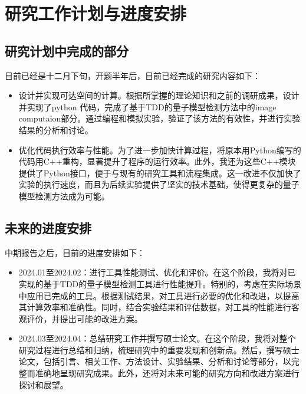 \section{研究工作计划与进度安排}
\subsection{研究计划中完成的部分}
目前已经是十二月下旬，开题半年后，目前已经完成的研究内容如下：
\begin{itemize}
    \item 设计并实现可达空间的计算。根据所掌握的理论知识和之前的调研成果，设计并实现了python 代码，完成了基于TDD的量子模型检测方法中的image computaion部分。通过编程和模拟实验，验证了该方法的有效性，并进行实验结果的分析和讨论。
    \item 优化代码执行效率与性能。为了进一步加快计算过程，将原本用Python编写的代码用C++重构，显著提升了程序的运行效率。此外，我还为这些C++模块提供了Python接口，便于与现有的研究工具和流程集成。这一改进不仅加快了实验的执行速度，而且为后续实验提供了坚实的技术基础，使得更复杂的量子模型检测方法成为可能。
\end{itemize}
\subsection{未来的进度安排}
中期报告之后，目前的进度安排如下： 
\begin{itemize}
    \item 2024.01至2024.02：进行工具性能测试、优化和评价。在这个阶段，我将对已实现的基于TDD的量子模型检测工具进行性能提升。特别的，考虑在实际场景中应用已完成的工具。根据测试结果，对工具进行必要的优化和改进，以提高其计算效率和准确性。同时，结合实验结果和评估数据，对工具的性能进行客观评价，并提出可能的改进方案。
    \item 2024.03至2024.04：总结研究工作并撰写硕士论文。在这个阶段，我将对整个研究过程进行总结和归纳，梳理研究中的重要发现和创新点。然后，撰写硕士论文，包括引言、相关工作、方法设计、实验结果、分析和讨论等部分，以完整而准确地呈现研究成果。此外，还将对未来可能的研究方向和改进方案进行探讨和展望。
\end{itemize}

